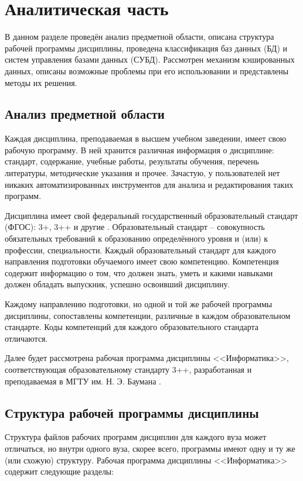 \section{Аналитическая часть}

В данном разделе проведён анализ предметной области, описана структура рабочей программы дисциплины, проведена классификация баз данных (БД) и систем управления базами данных (СУБД). Рассмотрен механизм кэшированных данных, описаны возможные проблемы при его использовании и представлены методы их решения.

\subsection{Анализ предметной области}

Каждая дисциплина, преподаваемая в высшем учебном заведении, имеет свою рабочую программу. В ней хранится различная информация о дисциплине: стандарт, содержание, учебные работы, результаты обучения, перечень литературы, методические указания и прочее. Зачастую, у пользователей нет никаких автоматизированных инструментов для анализа и редактирования таких программ.

Дисциплина имеет свой федеральный государственный образовательный стандарт (ФГОС): 3+, 3++ и другие \cite{standard}. Образовательный стандарт -- совокупность обязательных требований к образованию определённого уровня и (или) к профессии, специальности. Каждый образовательный стандарт для каждого направления подготовки обучаемого имеет свою компетенцию. Компетенция содержит информацию о том, что должен знать, уметь и какими навыками должен обладать выпускник, успешно освоивший дисциплину. 

Каждому направлению подготовки, но одной и той же рабочей программы дисциплины, сопоставлены компетенции, различные в каждом образовательном стандарте. Коды компетенций для каждого образовательного стандарта отличаются.

Далее будет рассмотрена рабочая программа дисциплины <<Информатика>>, соответствующая образовательному стандарту 3++, разработанная и преподаваемая в МГТУ им. Н. Э. Баумана \cite{bmstu}.

\subsection{Структура рабочей программы дисциплины} \label{sec:rpd-structure}

Структура файлов рабочих программ дисциплин для каждого вуза может отличаться, но внутри одного вуза, скорее всего, программы имеют одну и ту же (или схожую) структуру. Рабочая программа дисциплины <<Информатика>> содержит следующие разделы:

